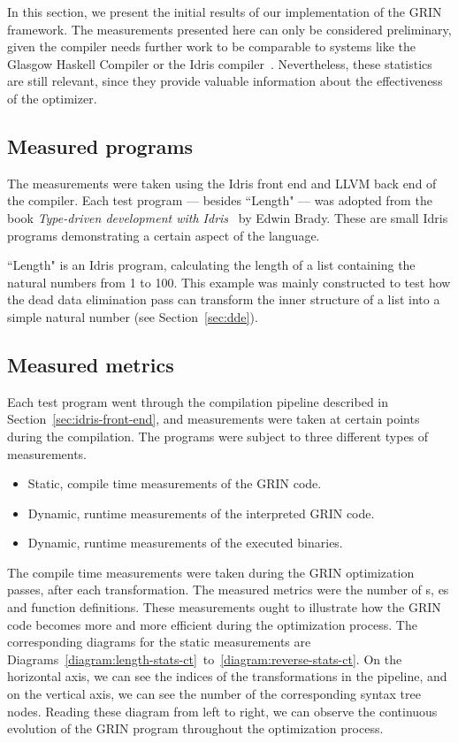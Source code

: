 \documentclass[main.tex]{subfiles}
\begin{document}
	
	In this section, we present the initial results of our implementation of the GRIN framework. The measurements presented here can only be considered preliminary, given the compiler needs further work to be comparable to systems like the Glasgow Haskell Compiler or the Idris compiler~\cite{idris}. Nevertheless, these statistics are still relevant, since they provide valuable information about the effectiveness of the optimizer.
	
	\subsection{Measured programs}
	
	The measurements were taken using the Idris front end and LLVM back end of the compiler. Each test program --- besides ``Length" --- was adopted from the book \textit{Type-driven development with Idris}~\cite{tdd-idris} by Edwin Brady. These are small Idris programs demonstrating a certain aspect of the language.
	
	``Length" is an Idris program, calculating the length of a list containing the natural numbers from 1 to 100. This example was mainly constructed to test how the dead data elimination pass can transform the inner structure of a list into a simple natural number (see Section~\ref{sec:dde}).
	
	\subsection{Measured metrics}
	
	Each test program went through the compilation pipeline described in Section~\ref{sec:idris-front-end}, and measurements were taken at certain points during the compilation. The programs were subject to three different types of measurements.
	
	\vspace{0.25cm}
	\begin{itemize}
		\item Static, compile time measurements of the GRIN code.
		\item Dynamic, runtime measurements of the interpreted GRIN code.
		\item Dynamic, runtime measurements of the executed binaries.
	\end{itemize}
	\vspace{0.25cm}

	The compile time measurements were taken during the GRIN optimization passes, after each transformation. The measured metrics were the number of s, es and function definitions. These measurements ought to illustrate how the GRIN code becomes more and more efficient during the optimization process. The corresponding diagrams for the static measurements are Diagrams~\ref{diagram:length-stats-ct}~to~\ref{diagram:reverse-stats-ct}. On the horizontal axis, we can see the indices of the transformations in the pipeline, and on the vertical axis, we can see the number of the corresponding syntax tree nodes. Reading these diagram from left to right, we can observe the continuous evolution of the GRIN program throughout the optimization process.
	
\end{document}
